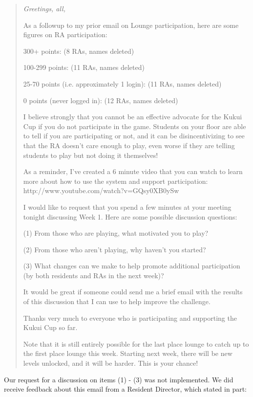 \documentclass[]{IEEEconf}
\begin{document}
\begin{quotation}
{\em 
\noindent Greetings, all,

\noindent As a followup to my prior email on Lounge participation, here are some
figures on RA participation:

300+ points: (8 RAs, names deleted)

100-299 points: (11 RAs, names deleted)

25-70 points (i.e. approximately 1 login): (11 RAs, names deleted)

0 points (never logged in): (12 RAs, names deleted)

\noindent I believe strongly that you cannot be an effective advocate for the
Kukui Cup if you do not participate in the game.  Students on your
floor are able to tell if you are participating or not, and it can be
disincentivizing to see that the RA doesn't care enough to play, even
worse if they are telling students to play but not doing it
themselves!

As a reminder, I've created a 6 minute video that you can watch to
learn more about how to use the system and support participation:
http://www.youtube.com/watch?v=GQsy0XB0ySw

I would like to request that you spend a few minutes at your meeting
tonight discussing Week 1.  Here are some possible discussion
questions:

(1) From those who are playing, what motivated you to play?

(2) From those who aren't playing, why haven't you started?

(3) What changes can we make to help promote additional participation
(by both residents and RAs in the next week)?

It would be great if someone could send me a brief email with the
results of this discussion that I can use to help improve the
challenge.

Thanks very much to everyone who is participating and supporting the
Kukui Cup so far.

Note that it is still entirely possible for the last place lounge to
catch up to the first place lounge this week.   Starting next week,
there will be new levels unlocked, and it will be harder.   This is
your chance!
}
\end{quotation}

Our request for a discussion on items (1) - (3) was not implemented.  We did receive
feedback about this email from
a Resident Director, which stated in part:
\end{document}
